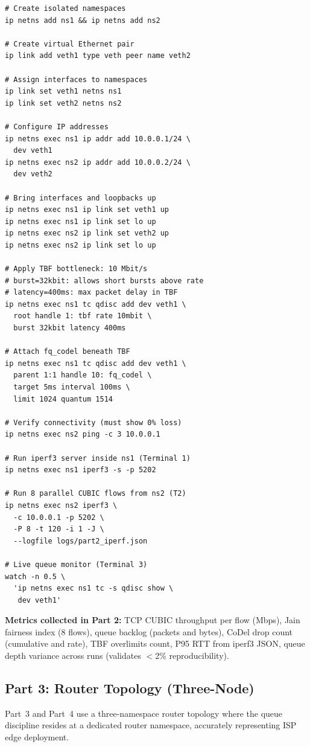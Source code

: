 \documentclass[conference]{IEEEtran}
\begin{document}
\begin{lstlisting}[caption=Part 2 two-node namespace testbed]
# Create isolated namespaces
ip netns add ns1 && ip netns add ns2

# Create virtual Ethernet pair
ip link add veth1 type veth peer name veth2

# Assign interfaces to namespaces
ip link set veth1 netns ns1
ip link set veth2 netns ns2

# Configure IP addresses
ip netns exec ns1 ip addr add 10.0.0.1/24 \
  dev veth1
ip netns exec ns2 ip addr add 10.0.0.2/24 \
  dev veth2

# Bring interfaces and loopbacks up
ip netns exec ns1 ip link set veth1 up
ip netns exec ns1 ip link set lo up
ip netns exec ns2 ip link set veth2 up
ip netns exec ns2 ip link set lo up

# Apply TBF bottleneck: 10 Mbit/s
# burst=32kbit: allows short bursts above rate
# latency=400ms: max packet delay in TBF
ip netns exec ns1 tc qdisc add dev veth1 \
  root handle 1: tbf rate 10mbit \
  burst 32kbit latency 400ms

# Attach fq_codel beneath TBF
ip netns exec ns1 tc qdisc add dev veth1 \
  parent 1:1 handle 10: fq_codel \
  target 5ms interval 100ms \
  limit 1024 quantum 1514

# Verify connectivity (must show 0% loss)
ip netns exec ns2 ping -c 3 10.0.0.1

# Run iperf3 server inside ns1 (Terminal 1)
ip netns exec ns1 iperf3 -s -p 5202

# Run 8 parallel CUBIC flows from ns2 (T2)
ip netns exec ns2 iperf3 \
  -c 10.0.0.1 -p 5202 \
  -P 8 -t 120 -i 1 -J \
  --logfile logs/part2_iperf.json

# Live queue monitor (Terminal 3)
watch -n 0.5 \
  'ip netns exec ns1 tc -s qdisc show \
   dev veth1'
\end{lstlisting}

\textbf{Metrics collected in Part 2:} TCP CUBIC throughput per flow (Mbps),
Jain fairness index (8 flows), queue backlog (packets and bytes), CoDel drop
count (cumulative and rate), TBF overlimits count, P95 RTT from iperf3 JSON,
queue depth variance across runs (validates $<$2\% reproducibility).

\subsection{Part 3: Router Topology (Three-Node)}

Part~3 and Part~4 use a three-namespace router topology where the queue
discipline resides at a dedicated router namespace, accurately representing ISP
edge deployment.
\end{document}
